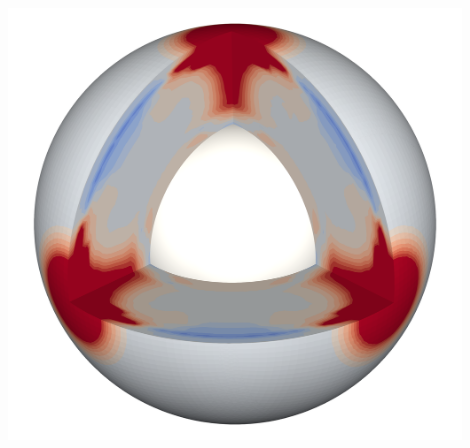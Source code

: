 \begin{titlepage}

\center %





\begin{tcolorbox}[width=16cm,colback=green!0!white,colframe=white]
 \begin{center}
     
 \YUGE \bfseries \thesistitle\\%
\large \subtitlethesis
 \end{center}
\end{tcolorbox}


\includegraphics[width=12cm]{title/3Dspherical_global19.png}
\vspace{0.5cm}



\end{titlepage}
